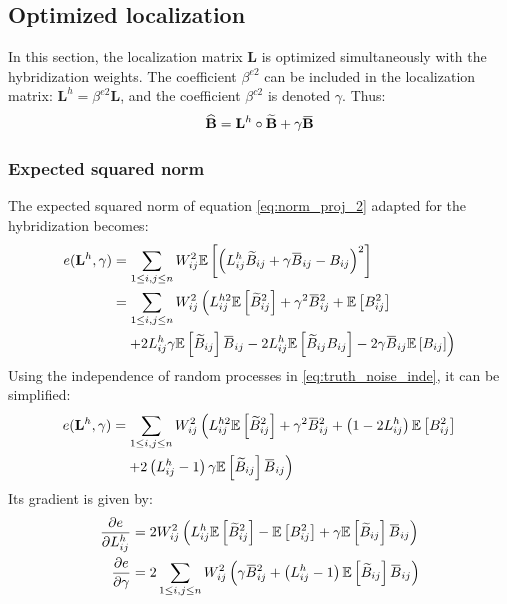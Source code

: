 \documentclass[12pt]{scrartcl}
\newcommand{\overbar}[1]{\mkern 1.5mu\overline{\mkern-1.5mu#1\mkern-1.5mu}\mkern 1.5mu}
\begin{document}
\subsection{Optimized localization}
In this section, the localization matrix $\mathbf{L}$ is optimized simultaneously with the hybridization weights. The coefficient $\beta^{e2}$ can be included in the localization matrix: $\mathbf{L}^h = \beta^{e2} \mathbf{L}$, and the coefficient $\beta^{c2}$ is denoted $\gamma$. Thus:
\begin{align}
\widehat{\mathbf{B}} = \mathbf{L}^h \circ \widetilde{\mathbf{B}} + \gamma \overbar{\mathbf{B}}
\end{align}

\subsubsection{Expected squared norm}
The expected squared norm of equation \eqref{eq:norm_proj_2} adapted for the hybridization becomes:
\begin{align}
e(\mathbf{L}^h,\gamma) & = \sum_{1 \le i,j \le n} W_{ij}^2 \mathbb{E}\left[ \left(L^h_{ij} \widetilde{B}_{ij} + \gamma \overbar{B}_{ij} - B_{ij} \right)^2 \right] \nonumber \\
& = \sum_{1 \le i,j \le n} W_{ij}^2 \left(L^{h2}_{ij} \mathbb{E} \left[\widetilde{B}_{ij}^2\right] + \gamma^2 \overbar{B}_{ij}^2 + \mathbb{E} \left[B^2_{ij}\right] \right. \nonumber \\
& \left. \quad + 2 L^h_{ij} \gamma \mathbb{E} \left[\widetilde{B}_{ij}\right] \overbar{B}_{ij} - 2 L^h_{ij} \mathbb{E} \left[\widetilde{B}_{ij} B_{ij}\right] - 2 \gamma \overbar{B}_{ij} \mathbb{E} \left[B_{ij}\right] \right)
\end{align}
Using the independence of random processes in \eqref{eq:truth_noise_inde}, it can be simplified:
\begin{align}
e(\mathbf{L}^h,\gamma) & = \sum_{1 \le i,j \le n} W_{ij}^2 \left(L^{h2}_{ij} \mathbb{E} \left[\widetilde{B}_{ij}^2\right] + \gamma^2 \overbar{B}_{ij}^2 + \left(1 - 2 L^h_{ij}\right) \mathbb{E} \left[B^2_{ij}\right] \right. \nonumber \\
& \left. \quad + 2 \left(L^h_{ij} - 1\right) \gamma \mathbb{E} \left[\widetilde{B}_{ij}\right] \overbar{B}_{ij} \right)
\end{align}
Its gradient is given by:
\begin{subequations}
\begin{align}
\frac{\partial e}{\partial L^h_{ij}} & = 2 W_{ij}^2 \left(L^h_{ij} \mathbb{E} \left[\widetilde{B}_{ij}^2\right] - \mathbb{E} \left[B^2_{ij}\right] + \gamma \mathbb{E} \left[\widetilde{B}_{ij}\right] \overbar{B}_{ij} \right) \\
\frac{\partial e}{\partial \gamma} & = 2 \sum_{1 \le i,j \le n} W_{ij}^2 \left(\gamma \overbar{B}_{ij}^2 + \left(L^h_{ij} - 1\right) \mathbb{E} \left[\widetilde{B}_{ij}\right] \overbar{B}_{ij} \right)
\end{align}
\end{subequations}
\end{document}

